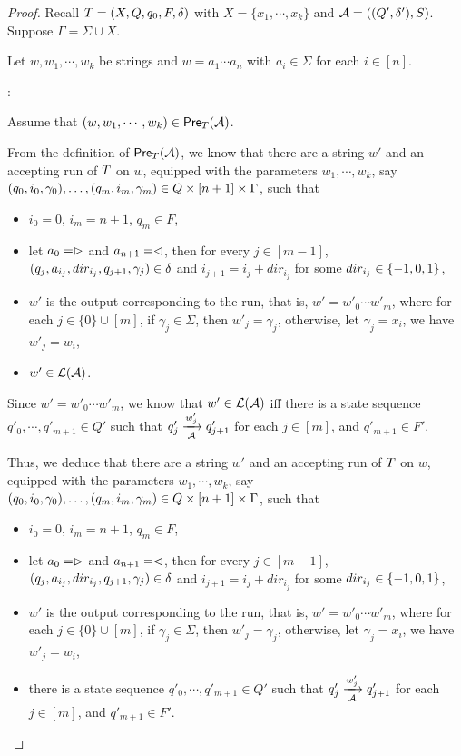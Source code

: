 \begin{proof}
Recall $T = (X, Q, q_0, F, \delta)$ with $X= \{x_1,\cdots, x_k\}$ and $\mathcal{A} =( (Q', \delta'), S)$. 
Suppose $\Gamma = \Sigma \cup X$. 

Let $w, w_1, \cdots, w_k$ be strings and $w = a_1 \cdots a_n$ with $a_i \in \Sigma$ for each $i \in [n]$.

\smallskip

: 

\smallskip

Assume that $(w, w_1,\cdots, w_k) \in \textsf{Pre}_{T}(\mathcal{A})$.


From the definition of $\textsf{Pre}_{T}(\mathcal{A})$, we know that there are a string $w' $ and an accepting run of $T$ on $w$, equipped with the parameters $w_1,\cdots, w_k$, say $(q_0, i_0, \gamma_0),\ldots, (q_m, i_m, \gamma_m) \in Q \times [n+1] \times \Gamma$, such that 
%
\begin{itemize}
\item $i_0=0$, $i_m = n+1$, $q_m \in F$,
%
\item let $a_0 = \vartriangleright$ and $a_{n+1} = \vartriangleleft$,  then for every $j \in [m-1]$, $(q_j, a_{i_j}, dir_{i_j}, q_{j+1}, \gamma_j) \in
        \delta$ and $i_{j+1} = i_j + dir_{i_j}$ for some $dir_{i_j} \in \{-1, 0, 1\}$, 
 \item $w'$ is the output corresponding to the run, that is, $ w' = w'_0 \cdots w'_m$, where for each $j \in \{0\} \cup [m]$, if $\gamma_j \in \Sigma$, then $w'_j = \gamma_j$, otherwise, let $\gamma_j = x_i$, we have $w'_j = w_i$,
 \item  $w' \in \mathcal{L}(\mathcal{A})$.
\end{itemize}

Since $ w' = w'_0 \cdots w'_m$, we know that $w' \in \mathcal{L}(\mathcal{A})$ iff there is a state sequence $q'_0, \cdots, q'_{m+1} \in Q'$ such that $q'_j \xrightarrow[\mathcal{A}]{w'_j} q'_{j+1}$ for each $j \in [m]$, and $q'_{m+1} \in F'$.

Thus, we deduce that 
there are a string $w' $ and an accepting run of $T$ on $w$, equipped with the parameters $w_1,\cdots, w_k$, say $(q_0, i_0, \gamma_0),\ldots, (q_m, i_m, \gamma_m) \in Q \times [n+1] \times \Gamma$, such that 
%
\begin{itemize}
\item $i_0=0$, $i_m = n+1$, $q_m \in F$,
%
\item let $a_0 = \vartriangleright$ and $a_{n+1} = \vartriangleleft$,  then for every $j \in [m-1]$, $(q_j, a_{i_j}, dir_{i_j}, q_{j+1}, \gamma_j) \in
        \delta$ and $i_{j+1} = i_j + dir_{i_j}$ for some $dir_{i_j} \in \{-1, 0, 1\}$, 
 \item $w'$ is the output corresponding to the run, that is, $ w' = w'_0 \cdots w'_m$, where for each $j \in \{0\} \cup [m]$, if $\gamma_j \in \Sigma$, then $w'_j = \gamma_j$, otherwise, let $\gamma_j = x_i$, we have $w'_j = w_i$,
 \item  there is a state sequence $q'_0, \cdots, q'_{m+1} \in Q'$ such that $q'_j \xrightarrow[\mathcal{A}]{w'_j} q'_{j+1}$ for each $j \in [m]$, and $q'_{m+1} \in F'$.
\end{itemize}


\end{proof}

